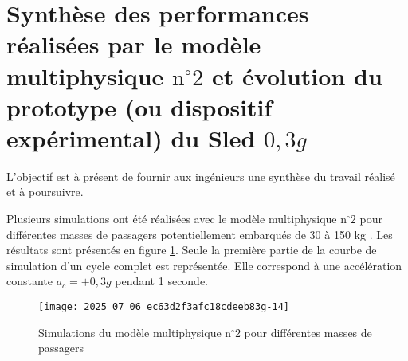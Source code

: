 
\section{Synthèse des performances réalisées par le modèle multiphysique $\mathrm{n}^{\circ} 2$ et évolution du prototype (ou dispositif expérimental) du Sled $0,3 g$ \label{ccs_mp_2022_sec_5}}

L'objectif est à présent de fournir aux ingénieurs une synthèse du travail réalisé et à poursuivre.

\ifprof
\else


Plusieurs simulations ont été réalisées avec le modèle multiphysique $\mathrm{n}^{\circ} 2$ pour différentes masses de passagers potentiellement embarqués de 30 à 150 kg . Les résultats sont présentés en figure \ref{ccs_mp_2022_fig_19}. Seule la première partie de la courbe de simulation d'un cycle complet est représentée. Elle correspond à une accélération constante $a_{c}=+0,3 g$ pendant 1 seconde.

\begin{figure}[!h]
\centering
\texttt{[image: 2025\_07\_06\_ec63d2f3afc18cdeeb83g-14]}

\caption{\label{ccs_mp_2022_fig_19}Simulations du modèle multiphysique $\text{n}^{\circ} 2$ pour différentes masses de passagers}
\end{figure}
\fi

